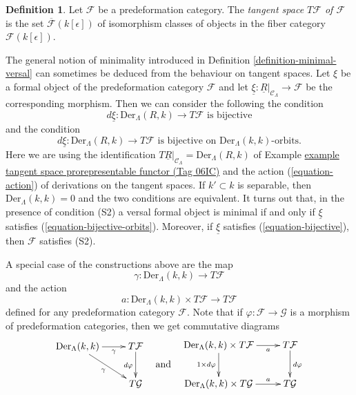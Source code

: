 \documentclass{amsart}
\theoremstyle{plain}
\theoremstyle{definition}
\newtheorem{definition}[subsection]{Definition}
\theoremstyle{remark}
\numberwithin{equation}{subsection}
\begin{document}
\begin{definition}
\label{definition-tangent-space}
Let $\mathcal{F}$ be a predeformation category.
The {\it tangent space $T \mathcal{F}$ of $\mathcal{F}$}
is the set $\overline{\mathcal{F}}(k[\epsilon])$
of isomorphism classes of objects in the fiber category $\mathcal
F(k[\epsilon])$.
\end{definition}

\noindent
The general notion of minimality introduced in
Definition \ref{definition-minimal-versal}
can sometimes be deduced from the behaviour on tangent spaces.
Let $\xi$ be a formal object of the predeformation category
$\mathcal{F}$ and let
$\underline{\xi} : \underline{R}|_{\mathcal{C}_\Lambda} \to \mathcal{F}$
be the corresponding morphism. Then we can consider the following
the condition
\begin{equation}
\label{equation-bijective}
d\underline{\xi} : \text{Der}_\Lambda(R, k) \to T\mathcal{F} 
\text{ is bijective}
\end{equation}
and the condition
\begin{equation}
\label{equation-bijective-orbits}
d\underline{\xi} : \text{Der}_\Lambda(R, k) \to T\mathcal{F} 
\text{ is bijective on }\text{Der}_\Lambda(k, k)\text{-orbits.}
\end{equation}
Here we are using the identification
$T\underline{R}|_{\mathcal{C}_\Lambda} = \text{Der}_\Lambda(R, k)$ of
Example \href{https://stacks.math.columbia.edu/tag/06IC}{example tangent space prorepresentable functor (Tag 06IC)}
and the action (\ref{equation-action}) of derivations
on the tangent spaces. If $k' \subset k$ is separable, then
$\text{Der}_\Lambda(k, k) = 0$ and the two conditions are equivalent.
It turns out that, in the presence of condition (S2) a versal formal
object is minimal if and only if $\underline{\xi}$ satisfies
(\ref{equation-bijective-orbits}).
Moreover, if $\underline{\xi}$ satisfies (\ref{equation-bijective}), then
$\mathcal{F}$ satisfies (S2).

\noindent
A special case of the constructions above are the map
\begin{equation}
\label{equation-map}
\gamma : \text{Der}_\Lambda(k, k) \longrightarrow T\mathcal{F}
\end{equation}
and the action
\begin{equation}
\label{equation-action}
a : \text{Der}_\Lambda(k, k) \times T\mathcal{F} \longrightarrow T\mathcal{F}
\end{equation}
defined for any predeformation category $\mathcal{F}$.
Note that if $\varphi : \mathcal{F} \to \mathcal{G}$ is a morphism
of predeformation categories, then we get commutative diagrams
$$
\vcenter{
\xymatrix{
\text{Der}_\Lambda(k, k) \ar[r]_-\gamma \ar[rd]_\gamma &
T\mathcal{F} \ar[d]_{d\varphi} \\
& T\mathcal{G}
}
}
\quad\text{and}\quad
\vcenter{
\xymatrix{
\text{Der}_\Lambda(k, k) \times T\mathcal{F} \ar[r]_-a
\ar[d]_{1 \times d\varphi} &
T\mathcal{F} \ar[d]^{d\varphi} \\
\text{Der}_\Lambda(k, k) \times T\mathcal{G} \ar[r]^-a &
T\mathcal{G}
}
}
$$
\end{document}
